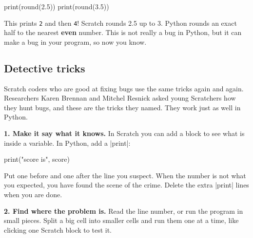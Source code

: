 \noindent\begin{minipage}[c]{0.55\linewidth}
\begin{code}
print(round(2.5))
print(round(3.5))
\end{code}
\end{minipage}\hfill
\begin{minipage}[c]{0.42\linewidth}\small\raggedright
This prints \texttt{2} and then \texttt{4}! Scratch rounds 2.5 up to 3. Python rounds an exact half to the nearest \textbf{even} number. This is not really a bug in Python, but it can make a bug in your program, so now you know.
\end{minipage}

\subsection*{Detective tricks}

Scratch coders who are good at fixing bugs use the same tricks again and again. Researchers Karen Brennan and Mitchel Resnick asked young Scratchers how they hunt bugs, and these are the tricks they named. They work just as well in Python.

\textbf{1. Make it say what it knows.} In Scratch you can add a  block to see what is inside a variable. In Python, add a \py|print|:

\begin{tcbraster}[raster columns=2, raster equal height=rows, raster column skip=12pt, raster valign=center]
\begin{tcolorbox}[colback=white, colframe=white, boxrule=0pt, valign=center]
\begin{scratch}
\end{scratch}
\end{tcolorbox}
\begin{code}
print("score is", score)
\end{code}
\end{tcbraster}

Put one before and one after the line you suspect. When the number is not what you expected, you have found the scene of the crime. Delete the extra \py|print| lines when you are done.

\textbf{2. Find where the problem is.} Read the line number, or run the program in small pieces. Split a big cell into smaller cells and run them one at a time, like clicking one Scratch block to test it.

